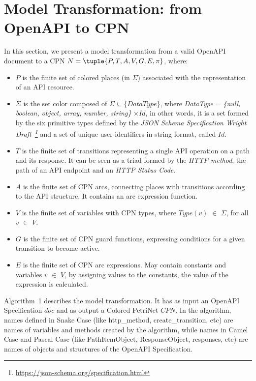 \section{Model Transformation: from OpenAPI to CPN}
\label{sec:transformation}

In this section, we present a model transformation from a valid OpenAPI document to a CPN $N=\tuple{P,T,A,V,G,E,\pi}$, where:

\begin{itemize}

\item \(P\) is the finite set of colored places (in \(\Sigma\)) associated with the representation of an API resource.

\item \(\Sigma\) is the set color composed of \(\Sigma \subseteq \{ DataType\}\), where \textit{DataType = \{null, boolean, object, array, number, string\}} \(\times Id \), in other words, it is a set formed by the six primitive types defined by the \textit{JSON Schema Specification Wright Draft~\footnote{\url{https://json-schema.org/specification.html}}} and a set of unique user identifiers in string format, called \(Id\).

\item \(T\) is the finite set of transitions representing a single API operation on a path and its response. 
It can be seen as a triad formed by the \textit{HTTP method}, the path of an API endpoint and an \textit{HTTP Status Code}.

\item \(A\) is the finite set of CPN arcs, connecting places with transitions according to the API structure. It contains an arc expression function.

\item \(V\) is the finite set of variables with CPN types, where \(Type(v)\) \(\in\) \(\Sigma\),  for all \(v\) \(\in\) \(V\).

\item \(G\) is the finite set of CPN guard functions, expressing conditions for a given transition to become active.

\item \(E\) is the finite set of CPN arc expressions. May contain constants and variables \(v\) \(\in\) \(V\), by assigning values to the constants, the value of the expression is calculated.


\end{itemize}

Algorithm~1 describes the model transformation. It has as input an OpenAPI Specification $doc$ and as output a Colored PetriNet $CPN$. In the algorithm, names defined in Snake Case (like http\_method, create\_transition, etc) are names of variables and methods created by the algorithm, while names in Camel Case and Pascal Case (like PathItemObject, ResponseObject, responses, etc) are names of objects and structures of the OpenAPI Specification.

